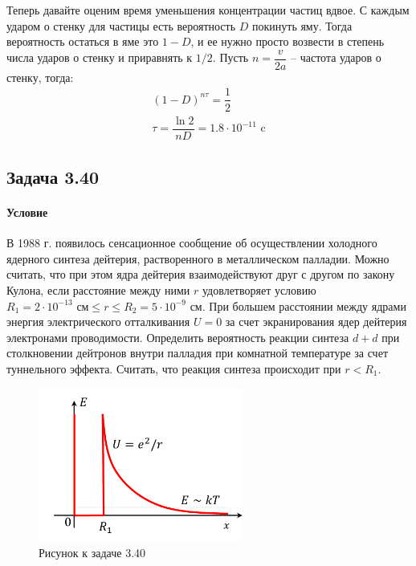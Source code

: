 \documentclass[12pt]{article}
\begin{document}
Теперь давайте оценим время уменьшения концентрации частиц вдвое. С каждым ударом о стенку для частицы есть вероятность $D$ покинуть яму. Тогда вероятность остаться в яме это $1-D$, и ее нужно просто возвести в степень числа ударов о стенку и приравнять к $1/2$. Пусть $n=\dfrac{v}{2a}$ -- частота ударов о стенку, тогда:
\begin{gather*}
    (1-D)^{n\tau} = \dfrac{1}{2}\\
    \tau = \dfrac{\ln{2}}{nD} = 1.8\cdot 10^{-11} \text{ c}
\end{gather*}
\subsection{Задача 3.40}
\label{task_3.40}
\paragraph{Условие}
В 1988 г. появилось сенсационное сообщение об осуществлении холодного ядерного синтеза дейтерия, растворенного в металлическом палладии. Можно считать, что при этом ядра дейтерия взаимодействуют друг с другом по закону Кулона, если расстояние между ними $r$ удовлетворяет условию $R_1 = 2\cdot 10^{-13} \text{ см} \le r \le  R_2 = 5\cdot 10^{-9} \text{ см}$. При большем расстоянии между ядрами энергия электрического отталкивания $U=0$ за счет экранирования ядер дейтерия электронами проводимости. Определить вероятность реакции синтеза $d+d$ при столкновении дейтронов внутри палладия при комнатной температуре за счет туннельного эффекта. Считать, что реакция синтеза происходит при $r<R_1$.
\begin{figure}[h]
    \centering
    \includegraphics[width=0.6\textwidth,height=\textheight,keepaspectratio]{Seminar_04/pics/pic_06.pdf}
    \caption{Рисунок к задаче 3.40}
\end{figure}
\end{document}
